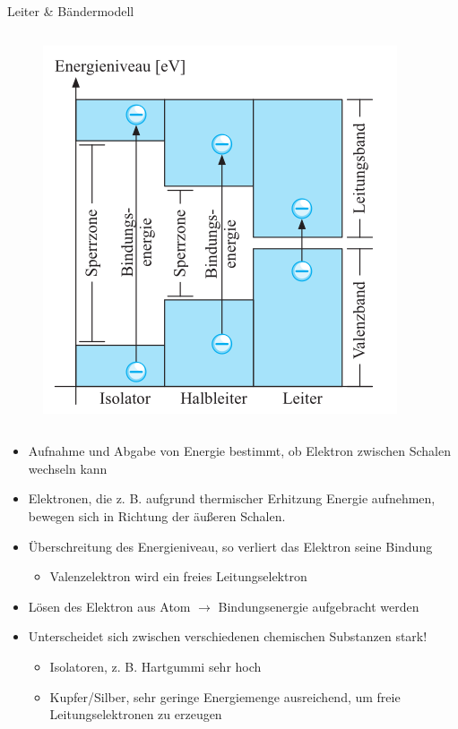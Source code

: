 \documentclass[12pt%
,aspectratio=169%
]{beamer}
\begin{document}
\begin{frame}{Leiter \& Bändermodell}
\begin{columns}[T]
\begin{column}{.48\textwidth}
\begin{figure}
\includegraphics[scale=.45]{pictures/halbleiter_band}
\end{figure}
\end{column}%
\end{columns}
\end{frame}

\begin{frame}
\begin{itemize}
	\item Aufnahme und Abgabe von Energie bestimmt, ob Elektron zwischen Schalen wechseln kann
	\item Elektronen, die z. B. aufgrund thermischer Erhitzung Energie aufnehmen, bewegen sich in Richtung der äußeren Schalen.
	\item Überschreitung des Energieniveau, so verliert das Elektron seine Bindung
	\begin{itemize}
		\item Valenzelektron wird ein freies Leitungselektron
	\end{itemize}
	\item Lösen des Elektron aus Atom $\to$ Bindungsenergie aufgebracht werden
	\item Unterscheidet sich zwischen verschiedenen chemischen Substanzen stark!
	\begin{itemize}
		\item Isolatoren, z. B. Hartgummi sehr hoch
		\item Kupfer/Silber, sehr geringe Energiemenge ausreichend, um freie Leitungselektronen zu erzeugen
	\end{itemize}
\end{itemize}
\end{frame}
\end{document}
